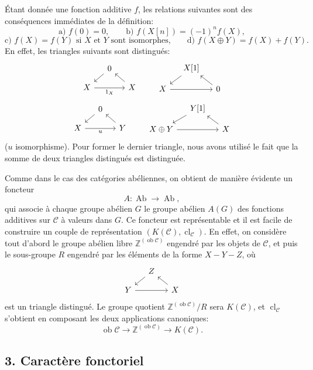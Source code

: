 \documentclass[11pt]{article}
\providecommand{\Ob}{\operatorname{ob}}
\providecommand{\cC}{\mathcal C}
\providecommand{\Ob}{\operatorname{ob}}
\providecommand{\Ab}{\operatorname{Ab}}
\providecommand{\cC}{\mathcal C}
\providecommand{\Ab}{\operatorname{Ab}}
\providecommand{\Ob}{\operatorname{Ob}}
\begin{document}
Étant donnée une fonction additive $f$, les relations suivantes sont des conséquences immédiates de la définition:
\[
\text{a) } f(0)=0,\qquad
\text{b) } f(X[n])=(-1)^n f(X),
\]
\[
\text{c) } f(X)=f(Y)\text{ si }X\text{ et }Y\text{ sont isomorphes,}
\qquad
\text{d) } f(X\oplus Y)=f(X)+f(Y).
\]
En effet, les triangles suivants sont distingués:
\[
\begin{tikzcd}[column sep=small,row sep=small]
&0 \arrow[dl]\\ X \arrow[rr,"1_X"']&&X\arrow[ul]
\end{tikzcd}
\qquad
\begin{tikzcd}[column sep=small,row sep=small]
&X[1]\arrow[dl]\\ X\arrow[rr]&&0\arrow[ul]
\end{tikzcd}
\]
\[
\begin{tikzcd}[column sep=small,row sep=small]
&0\arrow[dl]\\ X\arrow[rr,"u"']&&Y\arrow[ul]
\end{tikzcd}
\qquad
\begin{tikzcd}[column sep=small,row sep=small]
&Y[1]\arrow[dl]\\ X\oplus Y\arrow[rr]&&X\arrow[ul]
\end{tikzcd}
\]
($u$ isomorphisme). Pour former le dernier triangle, nous avons utilisé le fait que la somme de deux triangles distingués est distinguée.

Comme dans le cas des catégories abéliennes, on obtient de manière évidente un foncteur
\[
A:\Ab\longrightarrow\Ab,
\]
qui associe à chaque groupe abélien $G$ le groupe abélien $A(G)$ des fonctions additives sur $\cC$ à valeurs dans $G$. Ce foncteur est représentable et il est facile de construire un couple de représentation $(K(\cC),\operatorname{cl}_{\cC})$. En effet, on considère tout d'abord le groupe abélien libre $\mathbb Z^{(\Ob\cC)}$ engendré par les objets de $\cC$, et puis le sous-groupe $R$ engendré par les éléments de la forme $X-Y-Z$, où
\[
\begin{tikzcd}[column sep=small,row sep=small]
&Z\arrow[dl]\\ Y\arrow[rr]&&X\arrow[ul]
\end{tikzcd}
\]
est un triangle distingué. Le groupe quotient $\mathbb Z^{(\Ob\cC)}/R$ sera $K(\cC)$, et $\operatorname{cl}_{\cC}$ s'obtient en composant les deux applications canoniques:
\[
\Ob\cC\longrightarrow \mathbb Z^{(\Ob\cC)}\longrightarrow K(\cC).
\]

\subsection*{3. Caractère fonctoriel}
\end{document}
